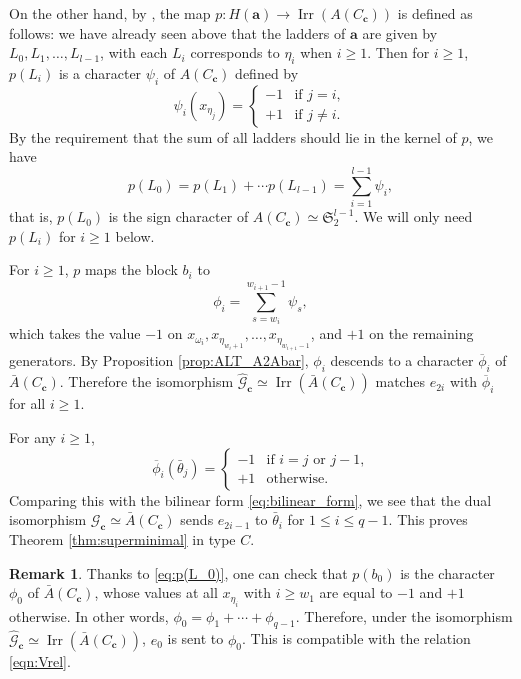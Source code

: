 \documentclass{amsart}
\theoremstyle{definition}
\newtheorem{remark}[theorem]{Remark}
\DeclareMathOperator{\Irr}{Irr}
\newcommand{\cG}{\mathcal{G}}
\newcommand{\ba}{\mathbf{a}}
\newcommand{\bc}{{\mathbf{c}}}
\newcommand{\frakS}{\mathfrak{S}}
\newcommand{\Ab}{\bar{A}}
\newcommand{\0}{\mathcal{O}}
\begin{document}
On the other hand, by \cite[\S\,11.6]{Lusztig:icc}, the map $p: H(\ba) \to \Irr(A(C_\bc))$ is defined as follows: we have already seen above that the ladders of $\ba$ are given by $L_0, L_1, \ldots, L_{l-1}$, with each $L_i$ corresponds to $\eta_i$ when $i \ge 1$. Then for $i \ge 1$, $p(L_i)$ is a character $\psi_i$ of $A(C_\bc)$ defined by 
\[
	\psi_i(x_{\eta_j})=
	\begin{cases}
		-1 & \text{if } j=i, \\
		+1 & \text{if } j \neq i.
	\end{cases}
\]	
By the requirement that the sum of all ladders should lie in the kernel of $p$, we have 
\begin{equation} \label{eq:p(L_0)}
	p(L_0) = p(L_1) + \cdots p(L_{l-1}) = \sum_{i = 1}^{l-1} \psi_i,
\end{equation} 
that is, $p(L_0)$ is the sign character of $A(C_\bc) \simeq \frakS_2^{l-1}$. We will only need $p(L_i)$ for $i \ge 1$ below.

For $i\ge 1$, $p$ maps the block $b_i$ to
\[ \phi_i=\sum_{s=w_i}^{w_{i+1}-1}\psi_s, \]
which takes the value $-1$ on $x_{\omega_i},x_{\eta_{w_i+1}},\ldots, x_{\eta_{w_{i+1}-1}}$, and $+1$ on the remaining generators. By Proposition \ref{prop:ALT_A2Abar}, $\phi_i$ descends to a character $\overline\phi_i$ of $\Ab(C_\bc)$.
Therefore the isomorphism $\hat{\cG}_\bc \simeq \Irr(\Ab(C_\bc))$ matches $e_{2i}$ with $\overline{\phi}_i$ for all $i \ge 1$. 

For any $i \ge 1$, 
\[
	\overline{\phi}_i (\bar{\theta}_j) =
	\begin{cases}
		-1 & \text{if $i = j$ or $j-1$,} \\
		+1 & \text{otherwise.}
	\end{cases}
\]
Comparing this with the bilinear form \eqref{eq:bilinear_form}, we see that the
dual isomorphism $\cG_\bc \simeq \Ab(C_\bc)$ sends $e_{2i-1}$ to
$\bar{\theta}_i$ for $1\le i\le q-1$.  This proves
Theorem \ref{thm:superminimal} in type $C$.

\begin{remark}
	Thanks to \eqref{eq:p(L_0)}, one can check that $p(b_0)$ is the character $\phi_0$ of $\Ab(C_\bc)$, whose values at all $x_{\eta_i}$ with $i \ge w_1$ are equal to $-1$ and $+1$ otherwise. In other words, $\phi_0 = \phi_1 + \cdots + \phi_{q-1}$. Therefore, under the isomorphism $\hat{\cG}_\bc \simeq \Irr(\Ab(C_\bc))$, $e_0$ is sent to $\phi_0$. This is compatible with the relation \eqref{eqn:Vrel}.
\end{remark}
\end{document}
